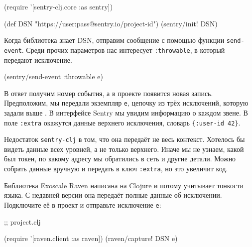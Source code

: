 \else

\begin{english}
  \begin{clojure}
(require '[sentry-clj.core :as sentry])

(def DSN "https://user:pass@sentry.io/project-id")
(sentry/init! DSN)
  \end{clojure}
\end{english}

\fi

Когда библиотека знает DSN, отправим сообщение с помощью функции
\verb|send-event|. Среди прочих параметров нас интересует \verb|:throwable|, в
который передают исключение.

\begin{english}
  \begin{clojure}
(sentry/send-event {:throwable e})
  \end{clojure}
\end{english}

В ответ получим номер события, а в проекте появится новая запись. Предположим,
мы передали экземпляр \verb|e|, цепочку из трёх исключений, которую задали
выше . В интерфейсе Sentry мы увидим информацию о каждом звене. В
поле \verb|:extra| окажутся данные верхнего исключения, словарь
\verb|{:user-id 42}|.

Недостаток \verb|sentry-clj| в том, что она передаёт не весь
контекст. Хотелось бы видеть данные всех уровней, а не только верхнего. Иначе мы
не узнаем, какой был токен, по какому адресу мы обратились в сеть и другие
детали. Можно собрать данные вручную и передать в ключ \verb|:extra|, но это
увеличит код.


Библиотека Exoscale Raven написана на Clojure и потому учитывает тонкости
языка. С недавней версии она передаёт полные данные об
исключении. Подключите её в проект и отправьте исключение \verb|e|:

\begin{english}
  \begin{clojure}
 ;; project.clj

(require '[raven.client :as raven])
(raven/capture! DSN e)
  \end{clojure}
\end{english}

